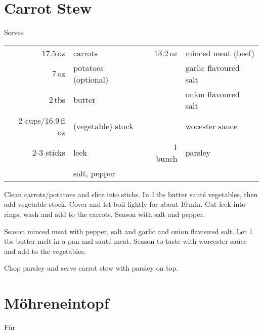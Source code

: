 ﻿\section{Carrot Stew}
\begin{centering}

Serves

\end{centering}

\begin{table}[H]
  \centering
    
  \begin{tabular*}{1\textwidth}{rlrl}
    17.5\,oz & carrots  & 13.2\,oz & minced meat (beef) \\
	7\,oz & potatoes (optional) & & garlic flavoured salt \\
	2\,tbs & butter & & onion flavoured salt\\
	2 cups/16.9\,fl oz & (vegetable) stock & & wocester sauce \\
	2-3 sticks & leek & 1 bunch & parsley \\
	& salt, pepper &  & \\
  \end{tabular*}
\end{table}

\begin{Notes}
\item Clean carrots/potatoes and slice into sticks. In 1\,tbs butter saut\'{e} vegetables, then add vegetable stock. Cover and let boil lightly for about 10\,min. Cut leek into rings, wash and add to the carrots. Season with salt and pepper.
\item Season minced meat with pepper, salt and garlic and onion flavoured salt. Let 1\,tbs butter melt in a pan and saut\'{e} meat. Season to taste with worcester sauce and add to the vegetables.
\item Chop parsley and serve carrot stew with parsley on top.
\end{Notes}


\section*{M\"{o}hreneintopf}

\begin{centering}

F\"{u}r

\end{centering}


